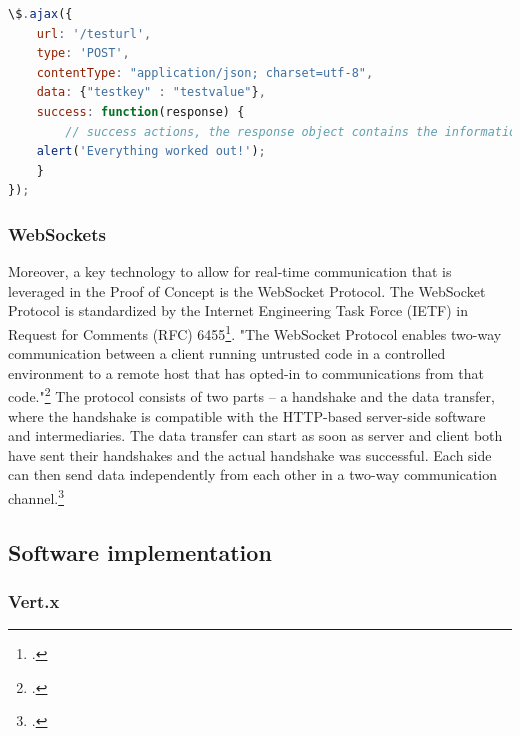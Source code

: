 \begin{lstlisting}[language=javascript,caption={Exemplary jQuery AJAX call},label={lst:jqueryajaxcall}]
\$.ajax({
    url: '/testurl',
    type: 'POST',
    contentType: "application/json; charset=utf-8",
    data: {"testkey" : "testvalue"},
    success: function(response) {
        // success actions, the response object contains the information sent from the server
	alert('Everything worked out!');
    }
});
\end{lstlisting}

\subsubsection{WebSockets}
\label{websockets}
Moreover, a key technology to allow for real-time communication that is leveraged
in the Proof of Concept is the WebSocket Protocol. The WebSocket Protocol is standardized
by the Internet Engineering Task Force (IETF) in Request for Comments (RFC)
6455\footcite[Cf.][]{rfc6455}. "The WebSocket Protocol enables two-way
communication between a client running untrusted code in a controlled
environment to a remote host that has opted-in to communications from that
code."\footcite[.][]{rfc6455} The protocol consists of two parts – a handshake
and the data transfer, where the handshake is compatible with the HTTP-based
server-side software and intermediaries. The data transfer can start as
soon as server and client both have sent their handshakes and the actual
handshake was successful. Each side can then send data independently from each
other in a two-way communication channel.\footcite[Cf.][]{rfc6455}



\FloatBarrier
\subsection{Software implementation}
\label{software_implementation}

\subsubsection{Vert.x}
\label{implementation_vertx}

